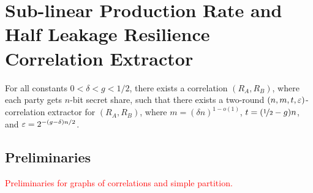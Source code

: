 \section{Sub-linear Production Rate and Half Leakage Resilience Correlation Extractor}\label{sec:bmn17}
\begin{theorem}
	\label{thm:bmn17}
	For all constants $0<\delta<g<1/2$, there exists a correlation $(R_A,R_B)$, where each party gets $n$-bit secret share, such that there exists a two-round $(n,m,t,\varepsilon)$-correlation extractor for $(R_A,R_B)$, where $m=(\delta n)^{1-o(1)}$, $t=(\nicefrac12-g)n$, and $\varepsilon=2^{-(g-\delta)n/2}$. 
\end{theorem}

\subsection{Preliminaries}
\textcolor{red}{Preliminaries for graphs of correlations and simple partition.}

\begin{definition}
	
\end{definition}

\begin{definition}
	
\end{definition}

\begin{definition}
	
\end{definition}

\begin{definition}
	
\end{definition}
